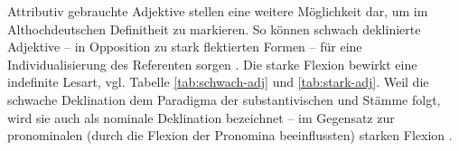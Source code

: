 Attributiv gebrauchte Adjektive stellen eine weitere Möglichkeit dar, um im Althochdeutschen Definitheit zu markieren. So können schwach deklinierte Adjektive -- in Opposition zu stark flektierten Formen -- für eine Individualisierung des Referenten sorgen \parencite[68]{Szczepaniak2011a}. Die starke Flexion bewirkt   eine indefinite Lesart, vgl. Tabelle \ref{tab:schwach-adj} und \ref{tab:stark-adj}.  Weil die schwache Deklination dem Paradigma der substantivischen  und Stämme folgt, wird sie auch als nominale Deklination bezeichnet -- im Gegensatz zur pronominalen  (durch die Flexion der Pronomina beeinflussten)  starken Flexion \parencite[s.][251]{Meineke2001}. 

\begin{table}
\centering
{}
\end{table}
